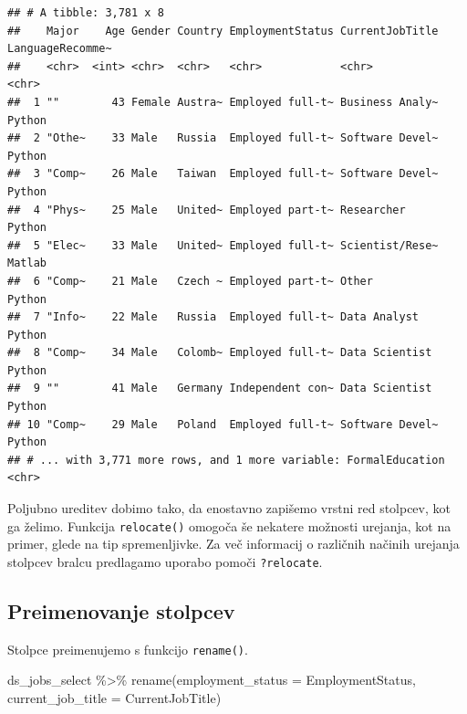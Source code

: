 \documentclass[
]{book}
\newenvironment{Shaded}{\begin{snugshade}}{\end{snugshade}}
\newcommand{\AttributeTok}[1]{\textcolor[rgb]{0.77,0.63,0.00}{#1}}
\newcommand{\FunctionTok}[1]{\textcolor[rgb]{0.00,0.00,0.00}{#1}}
\newcommand{\NormalTok}[1]{#1}
\newcommand{\SpecialCharTok}[1]{\textcolor[rgb]{0.00,0.00,0.00}{#1}}
\begin{document}
\begin{verbatim}
## # A tibble: 3,781 x 8
##    Major    Age Gender Country EmploymentStatus CurrentJobTitle LanguageRecomme~
##    <chr>  <int> <chr>  <chr>   <chr>            <chr>           <chr>           
##  1 ""        43 Female Austra~ Employed full-t~ Business Analy~ Python          
##  2 "Othe~    33 Male   Russia  Employed full-t~ Software Devel~ Python          
##  3 "Comp~    26 Male   Taiwan  Employed full-t~ Software Devel~ Python          
##  4 "Phys~    25 Male   United~ Employed part-t~ Researcher      Python          
##  5 "Elec~    33 Male   United~ Employed full-t~ Scientist/Rese~ Matlab          
##  6 "Comp~    21 Male   Czech ~ Employed part-t~ Other           Python          
##  7 "Info~    22 Male   Russia  Employed full-t~ Data Analyst    Python          
##  8 "Comp~    34 Male   Colomb~ Employed full-t~ Data Scientist  Python          
##  9 ""        41 Male   Germany Independent con~ Data Scientist  Python          
## 10 "Comp~    29 Male   Poland  Employed full-t~ Software Devel~ Python          
## # ... with 3,771 more rows, and 1 more variable: FormalEducation <chr>
\end{verbatim}

Poljubno ureditev dobimo tako, da enostavno zapišemo vrstni red stolpcev, kot ga želimo. Funkcija \texttt{relocate()} omogoča še nekatere možnosti urejanja, kot na primer, glede na tip spremenljivke. Za več informacij o različnih načinih urejanja stolpcev bralcu predlagamo uporabo pomoči \texttt{?relocate}.

\hypertarget{preimenovanje-stolpcev}{%
\subsection{Preimenovanje stolpcev}\label{preimenovanje-stolpcev}}

Stolpce preimenujemo s funkcijo \texttt{rename()}.

\begin{Shaded}
\begin{Highlighting}[]
\NormalTok{ds\_jobs\_select }\SpecialCharTok{\%\textgreater{}\%}
  \FunctionTok{rename}\NormalTok{(}\AttributeTok{employment\_status =}\NormalTok{ EmploymentStatus,}
         \AttributeTok{current\_job\_title =}\NormalTok{ CurrentJobTitle)}
\end{Highlighting}
\end{Shaded}
\end{document}
